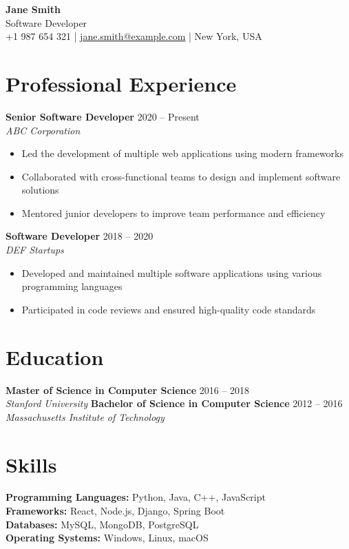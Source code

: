 \documentclass[11pt,a4paper]{article}
\begin{document}
\begin{center}
    {\Huge\textbf{Jane Smith}}\\[0.4cm]
    {\large Software Developer}\\[0.3cm]
    +1 987 654 321 | \href{mailto:jane.smith@example.com}{jane.smith@example.com} | New York, USA
\end{center}

\section{Professional Experience}
\textbf{Senior Software Developer} \hfill 2020 -- Present\\
\textit{ABC Corporation}
\begin{itemize}[noitemsep, topsep=3pt]
    \item Led the development of multiple web applications using modern frameworks
    \item Collaborated with cross-functional teams to design and implement software solutions
    \item Mentored junior developers to improve team performance and efficiency
\end{itemize}
\textbf{Software Developer} \hfill 2018 -- 2020\\
\textit{DEF Startups}
\begin{itemize}[noitemsep, topsep=3pt]
    \item Developed and maintained multiple software applications using various programming languages
    \item Participated in code reviews and ensured high-quality code standards
\end{itemize}

\section{Education}
\textbf{Master of Science in Computer Science} \hfill 2016 -- 2018\\
\textit{Stanford University}
\textbf{Bachelor of Science in Computer Science} \hfill 2012 -- 2016\\
\textit{Massachusetts Institute of Technology}

\section{Skills}
\textbf{Programming Languages:} Python, Java, C++, JavaScript\\
\textbf{Frameworks:} React, Node.js, Django, Spring Boot\\
\textbf{Databases:} MySQL, MongoDB, PostgreSQL\\
\textbf{Operating Systems:} Windows, Linux, macOS
\end{document}
